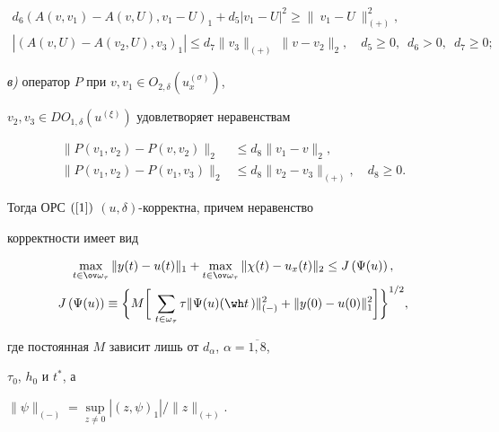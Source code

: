 \begin{thmnonum}
\begin{gather}


d_{6} \left( A(v,v_{1})-A(v,U),v_{1}-U \right)_1+d_{5}| v_{1}-U|^{2}


\ge  \|~v_{1}- U~\|_{(+)}^{2},\label{6} \\


\left| \left(A(v,U)-A(v_2,U),v_3\right)_1\right|\le d_7\|v_3\|_{(+)}\


\|v-v_2\|_2,\quad  d_{5}\ge 0,\ \; d_{6}>0,\ \; d_7\ge 0; \label{7}


\end{gather}





{\em в)} оператор $P$ при $v,v_1\in O_{2,\delta}(u_x^{(\sigma)})$,


$v_2,v_3\in DO_{1,\delta}(u^{(\xi)})$ удовлетворяет неравенствам


\begin{equation}


\label{8}


\begin{split}


\|P(v_1,v_2)-P(v,v_2)\|_2&\le d_8\|v_1-v\|_2,\\


\|P(v_1,v_2)-P(v_1,v_3)\|_2&\le d_8\|v_2-v_3\|_{(+)}, \quad d_8 \ge0. 


\end{split}


\end{equation}


Тогда ОРС $(\ref{1})$ $(u,\delta)$-корректна, причем неравенство 


корректности имеет вид


\begin{gather*}


\max_{t\in \ov \omega_\tau}\|y(t)-u(t)\|_1+


\max_{t\in \ov \omega_\tau}\|\chi(t)-u_x(t)\|_2 \le


J\left(\Psi(u)\right),\\


J\left(\Psi(u)\right)\equiv\bigg\{M\bigg[\,


\sum_{t\in \omega_\tau}\tau \|\Psi(u)(\wh t\,)\|_{(-)}^2+


\|y(0)-u(0)\|_1^2\bigg]\bigg\}^{1/2},


\end{gather*}


где постоянная $M$ зависит лишь от $d_\alpha$, $\alpha =\overline{1,8}$,  


$\tau_0$, $h_0$ и $t^*$, а


$\|\psi\|_{(-)}=\sup\limits_{z\ne 0}|(z,\psi)_1|/\|z\|_{(+)}$.


\end{thmnonum}





